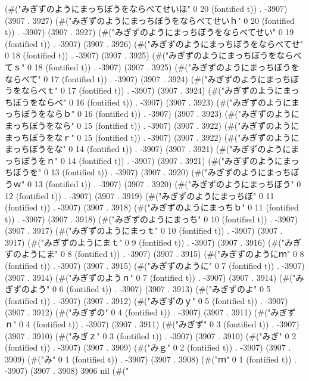 (#("みぎずのようにまっちぼうをならべてせいほ" 0 20 (fontified t)) . -3907) (3907 . 3927) (#("みぎずのようにまっちぼうをならべてせいｈ" 0 20 (fontified t)) . -3907) (3907 . 3927) (#("みぎずのようにまっちぼうをならべてせい" 0 19 (fontified t)) . -3907) (3907 . 3926) (#("みぎずのようにまっちぼうをならべてせ" 0 18 (fontified t)) . -3907) (3907 . 3925) (#("みぎずのようにまっちぼうをならべてｓ" 0 18 (fontified t)) . -3907) (3907 . 3925) (#("みぎずのようにまっちぼうをならべて" 0 17 (fontified t)) . -3907) (3907 . 3924) (#("みぎずのようにまっちぼうをならべｔ" 0 17 (fontified t)) . -3907) (3907 . 3924) (#("みぎずのようにまっちぼうをならべ" 0 16 (fontified t)) . -3907) (3907 . 3923) (#("みぎずのようにまっちぼうをならｂ" 0 16 (fontified t)) . -3907) (3907 . 3923) (#("みぎずのようにまっちぼうをなら" 0 15 (fontified t)) . -3907) (3907 . 3922) (#("みぎずのようにまっちぼうをなｒ" 0 15 (fontified t)) . -3907) (3907 . 3922) (#("みぎずのようにまっちぼうをな" 0 14 (fontified t)) . -3907) (3907 . 3921) (#("みぎずのようにまっちぼうをｎ" 0 14 (fontified t)) . -3907) (3907 . 3921) (#("みぎずのようにまっちぼうを" 0 13 (fontified t)) . -3907) (3907 . 3920) (#("みぎずのようにまっちぼうｗ" 0 13 (fontified t)) . -3907) (3907 . 3920) (#("みぎずのようにまっちぼう" 0 12 (fontified t)) . -3907) (3907 . 3919) (#("みぎずのようにまっちぼ" 0 11 (fontified t)) . -3907) (3907 . 3918) (#("みぎずのようにまっちｂ" 0 11 (fontified t)) . -3907) (3907 . 3918) (#("みぎずのようにまっち" 0 10 (fontified t)) . -3907) (3907 . 3917) (#("みぎずのようにまっｔ" 0 10 (fontified t)) . -3907) (3907 . 3917) (#("みぎずのようにまｔ" 0 9 (fontified t)) . -3907) (3907 . 3916) (#("みぎずのようにま" 0 8 (fontified t)) . -3907) (3907 . 3915) (#("みぎずのようにｍ" 0 8 (fontified t)) . -3907) (3907 . 3915) (#("みぎずのように" 0 7 (fontified t)) . -3907) (3907 . 3914) (#("みぎずのようｎ" 0 7 (fontified t)) . -3907) (3907 . 3914) (#("みぎずのよう" 0 6 (fontified t)) . -3907) (3907 . 3913) (#("みぎずのよ" 0 5 (fontified t)) . -3907) (3907 . 3912) (#("みぎずのｙ" 0 5 (fontified t)) . -3907) (3907 . 3912) (#("みぎずの" 0 4 (fontified t)) . -3907) (3907 . 3911) (#("みぎずｎ" 0 4 (fontified t)) . -3907) (3907 . 3911) (#("みぎず" 0 3 (fontified t)) . -3907) (3907 . 3910) (#("みぎｚ" 0 3 (fontified t)) . -3907) (3907 . 3910) (#("みぎ" 0 2 (fontified t)) . -3907) (3907 . 3909) (#("みｇ" 0 2 (fontified t)) . -3907) (3907 . 3909) (#("み" 0 1 (fontified t)) . -3907) (3907 . 3908) (#("ｍ" 0 1 (fontified t)) . -3907) (3907 . 3908) 3906 nil (#("
